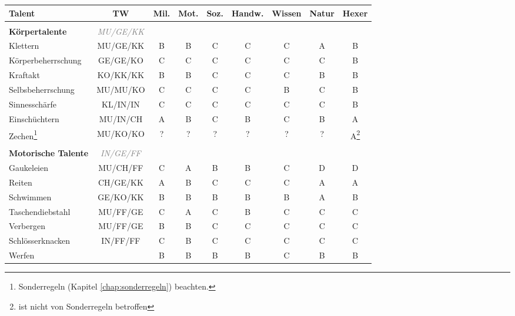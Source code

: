 \newpage
\begin{center}
\begin{longtable}{|l|c|c|c|c|c|c|c|c|}
\hline
Talent & TW & Mil. & Mot. & Soz. & Handw. & Wissen & Natur & Hexer \\

\hline
\multicolumn{9}{|l|}{} \\
\multicolumn{1}{|l}{\textbf{Körpertalente}} & \multicolumn{1}{c}{\textcolor{gray}{\textit{MU/GE/KK}}} & \multicolumn{7}{r|}{} \\
\hline
Klettern & MU/GE/KK & B & B & C & C & C & A & B \\
\hline
Körperbeherrschung & GE/GE/KO & C & C & C & C & C & C & B \\
\hline
Kraftakt & KO/KK/KK & B & B & C & C & C & B & B \\
\hline
Selbsbeherrschung & MU/MU/KO & C & C & C & C & B & C & B \\
\hline
Sinnesschärfe & KL/IN/IN & C & C & C & C & C & C & B \\
\hline
Einschüchtern & MU/IN/CH & A & B & C & B & C & B & A \\
\hline
Zechen\footnote{Sonderregeln (Kapitel \ref{chap:sonderregeln}) beachten.} & MU/KO/KO & ? & ? & ? & ? & ? & ? & A\footnote{ist nicht von Sonderregeln betroffen} \\


\hline
\multicolumn{9}{|l|}{} \\
\multicolumn{1}{|l}{\textbf{Motorische Talente}} & \multicolumn{1}{c}{\textcolor{gray}{\textit{IN/GE/FF}}} & \multicolumn{7}{r|}{} \\
\hline
Gaukeleien & MU/CH/FF & C & A & B & B & C & D & D \\
\hline
Reiten & CH/GE/KK & A & B & C & C & C & A & A \\
\hline
Schwimmen & GE/KO/KK & B & B & B & B & B & A & B \\
\hline
Taschendiebstahl & MU/FF/GE & C & A & C & B & C & C & C \\
\hline
Verbergen & MU/FF/GE & B & B & C & C & C & C & C \\
\hline
Schlösserknacken & IN/FF/FF & C & B & C & C & C & C & C \\
\hline
Werfen\footnotemark[3] & & B & B & B & B & C & B & B \\
 


\end{longtable}
\end{center}
